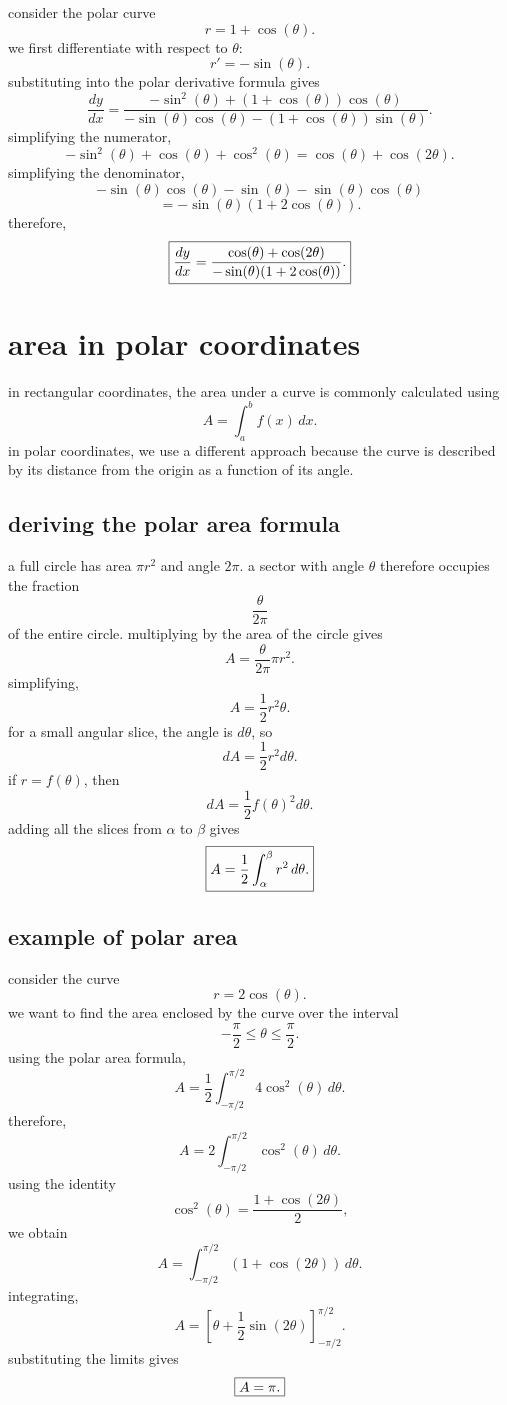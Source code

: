 \documentclass{article}
\newcommand{\mybox}[1]{\fbox{\ensuremath{\displaystyle #1}}}
\begin{document}
consider the polar curve
\[
r=1+\cos(\theta).
\]
we first differentiate with respect to $\theta$:
\[
r'=-\sin(\theta).
\]
substituting into the polar derivative formula gives
\[
\frac{dy}{dx}
=
\frac{
-\sin^2(\theta)+(1+\cos(\theta))\cos(\theta)
}{
-\sin(\theta)\cos(\theta)
-(1+\cos(\theta))\sin(\theta)
}.
\]
simplifying the numerator,
\[
-\sin^2(\theta)+\cos(\theta)+\cos^2(\theta)
=
\cos(\theta)+\cos(2\theta).
\]
simplifying the denominator,
\[
-\sin(\theta)\cos(\theta)-\sin(\theta)
-\sin(\theta)\cos(\theta)
\]
\[
=-\sin(\theta)(1+2\cos(\theta)).
\]
therefore,
\[
\mybox{
\frac{dy}{dx}
=
\frac{
\cos(\theta)+\cos(2\theta)
}{
-\sin(\theta)(1+2\cos(\theta))
}.
}
\]

\newpage

\section{area in polar coordinates}

in rectangular coordinates, the area under a curve is commonly calculated using
\[
A=\int_a^b f(x)\,dx.
\]
in polar coordinates, we use a different approach because the curve is described by its distance from the origin as a function of its angle.\\

\subsection{deriving the polar area formula}

a full circle has area $\pi r^2$ and angle $2\pi$. a sector with angle $\theta$ therefore occupies the fraction
\[
\frac{\theta}{2\pi}
\]
of the entire circle. multiplying by the area of the circle gives
\[
A=\frac{\theta}{2\pi}\pi r^2.
\]
simplifying,
\[
A=\frac12r^2\theta.
\]
for a small angular slice, the angle is $d\theta$, so
\[
dA=\frac12r^2d\theta.
\]
if $r=f(\theta)$, then
\[
dA=\frac12f(\theta)^2d\theta.
\]
adding all the slices from $\alpha$ to $\beta$ gives
\[
\mybox{
A=\frac12\int_\alpha^\beta r^2\,d\theta.
}
\]

\subsection{example of polar area}

consider the curve
\[
r=2\cos(\theta).
\]
we want to find the area enclosed by the curve over the interval
\[
-\frac{\pi}{2}\leq\theta\leq\frac{\pi}{2}.
\]
using the polar area formula,
\[
A=\frac12\int_{-\pi/2}^{\pi/2}4\cos^2(\theta)\,d\theta.
\]
therefore,
\[
A=2\int_{-\pi/2}^{\pi/2}\cos^2(\theta)\,d\theta.
\]
using the identity
\[
\cos^2(\theta)=\frac{1+\cos(2\theta)}{2},
\]
we obtain
\[
A=\int_{-\pi/2}^{\pi/2}(1+\cos(2\theta))\,d\theta.
\]
integrating,
\[
A=
\left[
\theta+\frac12\sin(2\theta)
\right]_{-\pi/2}^{\pi/2}.
\]
substituting the limits gives
\[
\mybox{A=\pi.}
\]
\end{document}
